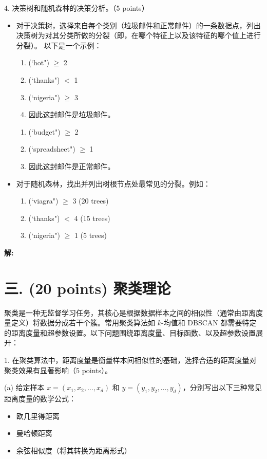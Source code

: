 \documentclass[8pt]{article}
\begin{document}
4. 决策树和随机森林的决策分析。（5 points）
\begin{itemize}
\item
对于决策树，选择来自每个类别（垃圾邮件和正常邮件）的一条数据点，列出决策树为对其分类所做的分裂（即，在哪个特征上以及该特征的哪个值上进行分裂）。
以下是一个示例：

\begin{enumerate}
    \item (`hot") $\geq$ 2
    \item (`thanks") $<$ 1
    \item (`nigeria") $\geq$ 3
    \item 因此这封邮件是垃圾邮件。
\end{enumerate}

\begin{enumerate}
    \item (`budget") $\geq$ 2
    \item (`spreadsheet") $\geq$ 1
    \item 因此这封邮件是正常邮件。
\end{enumerate}

\item
对于随机森林，找出并列出树根节点处最常见的分裂。例如：

\begin{enumerate}
    \item (`viagra") $\geq$ 3 (20 trees)
    \item (`thanks") $<$ 4 (15 trees)
    \item (`nigeria") $\geq$ 1 (5 trees)
\end{enumerate}

\end{itemize}

\textbf{\large 解:}

\vspace{3em}


\section*{三. (20 points) 聚类理论}

聚类是一种无监督学习任务，其核心是根据数据样本之间的相似性（通常由距离度量定义）将数据分成若干个簇。常用聚类算法如 \( k \)-均值和 DBSCAN 都需要特定的距离度量和超参数设置。以下问题围绕距离度量、目标函数、以及超参数设置展开：  

1. 
在聚类算法中，距离度量是衡量样本间相似性的基础，选择合适的距离度量对聚类效果有显著影响（5 points）。  

(a) 给定样本 \( x = (x_1, x_2, \dots, x_d) \) 和 \( y = (y_1, y_2, \dots, y_d) \)，分别写出以下三种常见距离度量的数学公式： 
\begin{itemize}
    \item 欧几里得距离  
    \item 曼哈顿距离
    \item 余弦相似度（将其转换为距离形式）  
\end{itemize}
\end{document}
